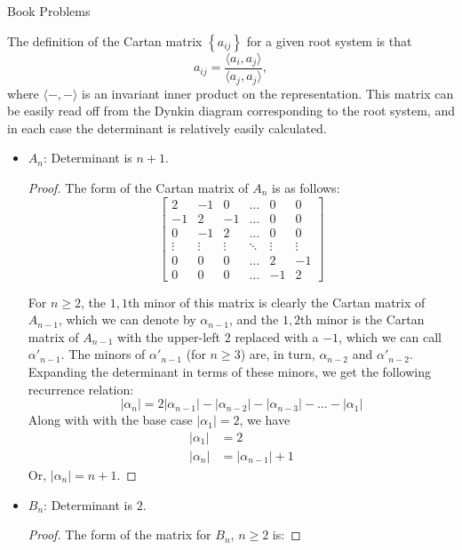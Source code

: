 \documentclass[12pt]{article}
\theoremstyle{definition}
\newenvironment{problem}[2][Problem]{\begin{trivlist}
\item[\hskip \labelsep {\bfseries #1}\hskip \labelsep {\bfseries #2.}]}{\end{trivlist}}
\begin{document}
\begin{section}{Book Problems}
\begin{problem}{8}
		\par The definition of the Cartan matrix $\left\{ a_{ij} \right\}$ for a given root system is that 
						\[a_{ij} = \frac{\langle a_i, a_j\rangle}{\langle a_j, a_j\rangle},\]where $\langle -, -\rangle$ is an invariant inner product on the representation. This matrix can be easily read off from the Dynkin diagram corresponding to the root system, and in each case the determinant is relatively easily calculated. 
			\begin{itemize}
				\item $A_n$: Determinant is $n+1$. \begin{proof}
						The form of the Cartan matrix of $A_n$ is as follows:
						\[\begin{bmatrix}
								2 & -1 & 0 & \dots & 0 & 0\\
								-1 & 2 & -1 & \dots & 0 & 0\\
								0 & -1 & 2 & \dots & 0 & 0\\
							\vdots & \vdots & \vdots & \ddots & \vdots & \vdots\\
							0 & 0 & 0 & \dots & 2 & -1\\
							0 & 0 & 0 & \dots & -1 & 2
					\end{bmatrix}\]
					\par For $n \geq 2$, the $1,1$th minor of this matrix is clearly the Cartan matrix of $A_{n-1}$, which we can denote by $\alpha_{n-1}$, and the $1,2$th minor is the Cartan matrix of $A_{n-1}$ with the upper-left $2$ replaced with a $-1$, which we can call $\alpha'_{n-1}$. The minors of $\alpha'_{n-1}$ (for $n \geq 3$) are, in turn, $\alpha_{n-2}$ and $\alpha'_{n-2}$. Expanding the determinant in terms of these minors, we get the following recurrence relation:
					\[\left \lvert { \alpha_n } \right \lvert = 2\left \lvert { \alpha_{n-1} } \right \lvert  - \lvert \alpha_{n-2}\rvert - \lvert\alpha_{n-3}\rvert - \dots - \lvert \alpha_1\rvert\]
					Along with with the base case $\left \lvert { \alpha_1 } \right \lvert = 2$, we have
					\begin{align*}
						\lvert \alpha_{1}\rvert &= 2\\
						\lvert \alpha_{n} \rvert &= \lvert \alpha_{n-1}\rvert + 1
					\end{align*}
					Or, $\lvert \alpha_{n}\rvert = n+1$.
					\end{proof}
				\item $B_n$: Determinant is $2$. \begin{proof}
						The form of the matrix for $B_n$, $n \geq 2$ is:

\end{proof}
\end{itemize}
\end{problem}
\end{section}
\end{document}
